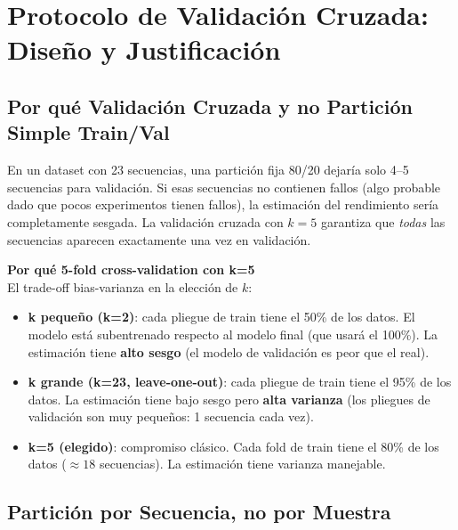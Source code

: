 \documentclass[12pt,a4paper]{article}
\begin{document}
\section{Protocolo de Validaci\'{o}n Cruzada: Dise\~{n}o y Justificaci\'{o}n}

\subsection{Por qu\'{e} Validaci\'{o}n Cruzada y no Partici\'{o}n Simple Train/Val}

En un dataset con 23 secuencias, una partici\'{o}n fija 80/20 dejar\'{i}a solo 4--5
secuencias para validaci\'{o}n. Si esas secuencias no contienen fallos (algo probable
dado que pocos experimentos tienen fallos), la estimaci\'{o}n del rendimiento ser\'{i}a
completamente sesgada. La validaci\'{o}n cruzada con $k=5$ garantiza que \textit{todas}
las secuencias aparecen exactamente una vez en validaci\'{o}n.

\begin{porquebox}
\textbf{Por qu\'{e} 5-fold cross-validation con k=5}\\[4pt]
El trade-off bias-varianza en la elecci\'{o}n de $k$:
\begin{itemize}[itemsep=2pt]
  \item \textbf{k peque\~{n}o (k=2)}: cada pliegue de train tiene el 50\% de los datos.
    El modelo est\'{a} subentrenado respecto al modelo final (que usar\'{a} el 100\%). La
    estimaci\'{o}n tiene \textbf{alto sesgo} (el modelo de validaci\'{o}n es peor que el real).
  \item \textbf{k grande (k=23, leave-one-out)}: cada pliegue de train tiene el 95\%
    de los datos. La estimaci\'{o}n tiene bajo sesgo pero \textbf{alta varianza}
    (los pliegues de validaci\'{o}n son muy peque\~{n}os: 1 secuencia cada vez).
  \item \textbf{k=5 (elegido)}: compromiso cl\'{a}sico. Cada fold de train tiene el 80\%
    de los datos ($\approx 18$ secuencias). La estimaci\'{o}n tiene varianza manejable.
\end{itemize}
\end{porquebox}

\subsection{Partici\'{o}n por Secuencia, no por Muestra}
\end{document}
